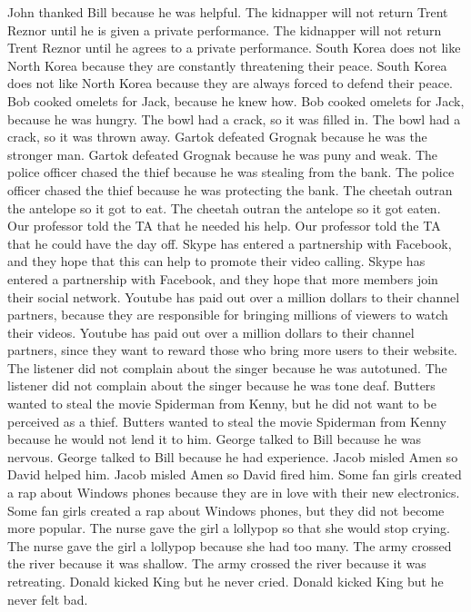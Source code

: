 \documentclass{article}
\begin{document}
\begin{enumerate}
	John thanked Bill because he was helpful.
	The kidnapper will not return Trent Reznor until he is given a private performance.
	The kidnapper will not return Trent Reznor until he agrees to a private performance.
	South Korea does not like North Korea because they are constantly threatening their peace.
	South Korea does not like North Korea because they are always forced to defend their peace.
	Bob cooked omelets for Jack, because he knew how.
	Bob cooked omelets for Jack, because he was hungry.
	The bowl had a crack, so it was filled in.
	The bowl had a crack, so it was thrown away.
	Gartok defeated Grognak because he was the stronger man.
	Gartok defeated Grognak because he was puny and weak.
	The police officer chased the thief because he was stealing from the bank.
	The police officer chased the thief because he was protecting the bank.
	The cheetah outran the antelope so it got to eat.
	The cheetah outran the antelope so it got eaten.
	Our professor told the TA that he needed his help.
	Our professor told the TA that he could have the day off.
	Skype has entered a partnership with Facebook, and they hope that this can help to promote their video calling.
	Skype has entered a partnership with Facebook, and they hope that more members join their social network.
	Youtube has paid out over a million dollars to their channel partners, because they are responsible for bringing millions of viewers to watch their videos.
	Youtube has paid out over a million dollars to their channel partners, since they want to reward those who bring more users to their website.
	The listener did not complain about the singer because he was autotuned.
	The listener did not complain about the singer because he was tone deaf.
	Butters wanted to steal the movie Spiderman from Kenny, but he did not want to be perceived as a thief.
	Butters wanted to steal the movie Spiderman from Kenny because he would not lend it to him.
	George talked to Bill because he was nervous.
	George talked to Bill because he had experience.
	Jacob misled Amen so David helped him.
	Jacob misled Amen so David fired him.
	Some fan girls created a rap about Windows phones because they are in love with their new electronics.
	Some fan girls created a rap about Windows phones, but they did not become more popular.
	The nurse gave the girl a lollypop so that she would stop crying.
	The nurse gave the girl a lollypop because she had too many.
	The army crossed the river because it was shallow.
	The army crossed the river because it was retreating.
	Donald kicked King but he never cried.
	Donald kicked King but he never felt bad.

\end{enumerate}
\end{document}
